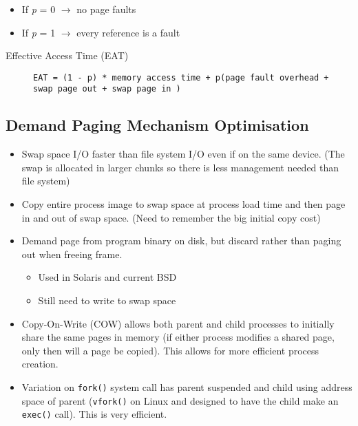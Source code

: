 \documentclass[11pt]{article}
\begin{document}
\begin{itemize}
\item If \emph{p} = 0 \(\rightarrow\) no page faults
\item If \emph{p} = 1 \(\rightarrow\) every reference is a fault
\end{itemize}


\begin{description}
\item[{Effective Access Time (EAT)}] \texttt{EAT = (1 - p) * memory access time + p(page fault overhead + swap page out + swap page in )}
\end{description}
\subsection{Demand Paging Mechanism Optimisation}
\label{sec:org7cae0dd}
\begin{itemize}
\item Swap space I/O faster than file system I/O even if on the same device. (The swap is allocated in larger chunks so there is less management needed than file system)
\item Copy entire process image to swap space at process load time and then page in and out of swap space. (Need to remember the big initial copy cost)
\item Demand page from program binary on disk, but discard rather than paging out when freeing frame.
\begin{itemize}
\item Used in Solaris and current BSD
\item Still need to write to swap space
\end{itemize}
\item Copy-On-Write (COW) allows both parent and child processes to initially share the same pages in memory (if either process modifies a shared page, only then will a page be copied). This allows for more efficient process creation.
\item Variation on \texttt{fork()} system call has parent suspended and child using address space of parent (\texttt{vfork()} on Linux and designed to have the child make an \texttt{exec()} call). This is very efficient.
\end{itemize}
\end{document}
